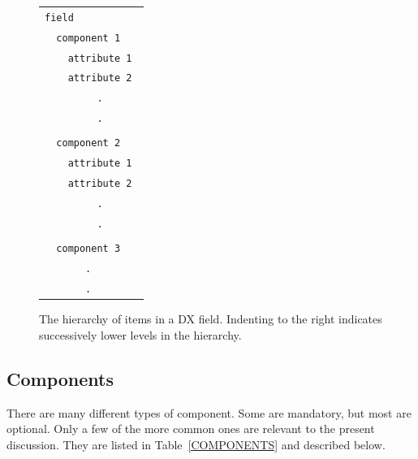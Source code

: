 \documentclass[twoside,11pt]{starlink}
\begin{document}
\begin{figure}[htbp]

\begin{center}

\begin{tabular}{l}
\texttt{field     } \\
\texttt{~~component 1   } \\
\texttt{~~~~attribute 1 } \\
\texttt{~~~~attribute 2 } \\
\texttt{~~~~~~~~~.      } \\
\texttt{~~~~~~~~~.      } \\
    \\
\texttt{~~component 2   } \\
\texttt{~~~~attribute 1 } \\
\texttt{~~~~attribute 2 } \\
\texttt{~~~~~~~~~.      } \\
\texttt{~~~~~~~~~.      } \\
   \\
\texttt{~~component 3   } \\
\texttt{~~~~~~~.        } \\
\texttt{~~~~~~~.        } \\
\end{tabular}
\end{center}

\begin{quote}
\caption[The hierarchy of items in a DX field.]{The hierarchy of items in
a DX field. Indenting to the right indicates successively lower levels in
the hierarchy. \label{DXITEMS} }
\end{quote}

\end{figure}

\subsection{Components}

There are many different types of component. Some are mandatory, but
most are optional. Only a few of the more common ones are relevant to
the present discussion. They are listed in Table~\ref{COMPONENTS} and
described below.
\end{document}
